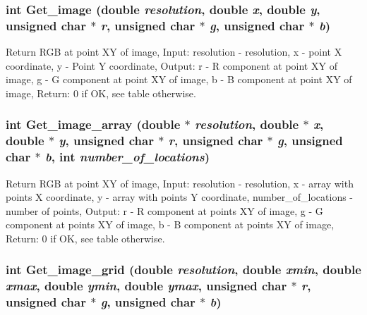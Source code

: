 \hypertarget{GisApi_8C_a68}{
\subsubsection[Get\_\-image]{\setlength{\rightskip}{0pt plus 5cm}int Get\_\-image (double {\em resolution}, double {\em x}, double {\em y}, unsigned char $\ast$ {\em r}, unsigned char $\ast$ {\em g}, unsigned char $\ast$ {\em b})}}
\label{GisApi_8C_a68}


Return RGB at point XY of image, Input: resolution - resolution, x - point X coordinate, y - Point Y coordinate, Output: r - R component at point XY of image, g - G component at point XY of image, b - B component at point XY of image, Return: 0 if OK, see table otherwise. 

\hypertarget{GisApi_8C_a73}{
\subsubsection[Get\_\-image\_\-array]{\setlength{\rightskip}{0pt plus 5cm}int Get\_\-image\_\-array (double $\ast$ {\em resolution}, double $\ast$ {\em x}, double $\ast$ {\em y}, unsigned char $\ast$ {\em r}, unsigned char $\ast$ {\em g}, unsigned char $\ast$ {\em b}, int {\em number\_\-of\_\-locations})}}
\label{GisApi_8C_a73}


Return RGB at point XY of image, Input: resolution - resolution, x - array with points X coordinate, y - array with points Y coordinate, number\_\-of\_\-locations - number of points, Output: r - R component at points XY of image, g - G component at points XY of image, b - B component at points XY of image, Return: 0 if OK, see table otherwise. 

\hypertarget{GisApi_8C_a80}{
\subsubsection[Get\_\-image\_\-grid]{\setlength{\rightskip}{0pt plus 5cm}int Get\_\-image\_\-grid (double {\em resolution}, double {\em xmin}, double {\em xmax}, double {\em ymin}, double {\em ymax}, unsigned char $\ast$ {\em r}, unsigned char $\ast$ {\em g}, unsigned char $\ast$ {\em b})}}
\label{GisApi_8C_a80}


